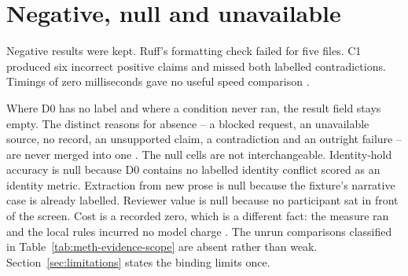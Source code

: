 \section{Negative, null and unavailable}

Negative results were kept. Ruff's formatting check failed for five files. C1 produced six incorrect
positive claims and missed both labelled contradictions. Timings of zero milliseconds gave no useful
speed comparison \citep{pineau2021reproducibility,nist2023airmf}.

Where D0 has no label and where a condition never ran, the result field stays empty. The distinct
reasons for absence -- a blocked request, an unavailable source, no record, an unsupported claim, a
contradiction and an outright failure -- are never merged into one
\citep{gebru2021datasheets,gao2023rarr}. The null cells are not interchangeable. Identity-hold
accuracy is null because D0 contains no labelled identity conflict scored as an identity metric.
Extraction from new prose is null because the fixture's narrative case is already labelled.
Reviewer value is null because no participant sat in front of the screen. Cost is a recorded
zero, which is a different fact: the measure ran and the local rules incurred no model charge
\citep{nikiforova2020quality,nist2023airmf}. The unrun comparisons classified in
Table~\ref{tab:meth-evidence-scope} are absent rather than weak. Section~\ref{sec:limitations}
states the binding limits once.
